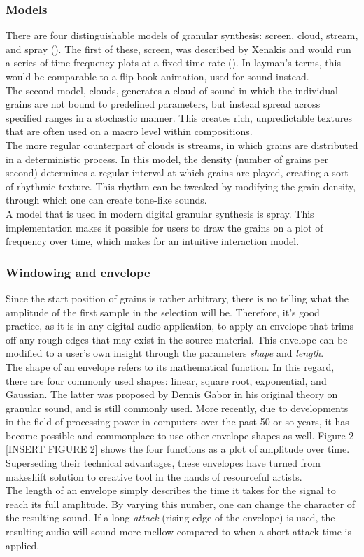 \documentclass[10pt, twocolumn]{IEEEtran}
\begin{document}
\subsubsection{Models}
There are four distinguishable models of granular synthesis: screen, cloud, stream, and spray (\cite{roads12}). The first of these, screen, was described by Xenakis and would run a series of time-frequency plots at a fixed time rate (\cite{xenakis63}). In layman's terms, this would be comparable to a flip book animation, used for sound instead. \\
The second model, clouds, generates a cloud of sound in which the individual grains are not bound to predefined parameters, but instead spread across specified ranges in a stochastic manner. This creates rich, unpredictable textures that are often used on a macro level within compositions. \\
The more regular counterpart of clouds is streams, in which grains are distributed in a deterministic process. In this model, the density (number of grains per second) determines a regular interval at which grains are played, creating a sort of rhythmic texture. This rhythm can be tweaked by modifying the grain density, through which one can create tone-like sounds. \\
A model that is used in modern digital granular synthesis is spray. This implementation makes it possible for users to draw the grains on a plot of frequency over time, which makes for an intuitive interaction model.

\subsubsection{Windowing and envelope}
Since the start position of grains is rather arbitrary, there is no telling what the amplitude of the first sample in the selection will be. Therefore, it's good practice, as it is in any digital audio application, to apply an envelope that trims off any rough edges that may exist in the source material. This envelope can be modified to a user's own insight through the parameters \textit{shape} and \textit{length}. \\
The shape of an envelope refers to its mathematical function. In this regard, there are four commonly used shapes: linear, square root, exponential, and Gaussian. The latter was proposed by Dennis Gabor in his original theory on granular sound, and is still commonly used. More recently, due to developments in the field of processing power in computers over the past 50-or-so years, it has become possible and commonplace to use other envelope shapes as well. Figure 2 [INSERT FIGURE 2] shows the four functions as a plot of amplitude over time.
Superseding their technical advantages, these envelopes have turned from makeshift solution to creative tool in the hands of resourceful artists. \\
The length of an envelope simply describes the time it takes for the signal to reach its full amplitude. By varying this number, one can change the character of the resulting sound. If a long \textit{attack} (rising edge of the envelope) is used, the resulting audio will sound more mellow compared to when a short attack time is applied.
\end{document}
